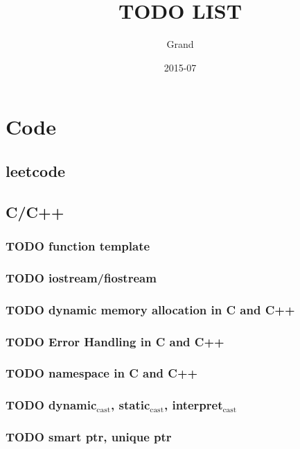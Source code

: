\documentclass[11pt]{article}
\title{\textbf{TODO} LIST}
\author{Grand}
\date{2015-07}
\begin{document}
\maketitle

\setcounter{tocdepth}{3}
\tableofcontents
\vspace*{1cm}


\section{Code}
\label{sec-1}
\subsection{leetcode}
\label{sec-1-1}
\subsection{C/C++}
\label{sec-1-2}
\subsubsection{\textbf{TODO} function template}
\label{sec-1-2-1}
\subsubsection{\textbf{TODO} iostream/fiostream}
\label{sec-1-2-2}
\subsubsection{\textbf{TODO} dynamic memory allocation in C and C++}
\label{sec-1-2-3}
\subsubsection{\textbf{TODO} Error Handling in C and C++}
\label{sec-1-2-4}
\subsubsection{\textbf{TODO} namespace in C and C++}
\label{sec-1-2-5}
\subsubsection{\textbf{TODO} dynamic$_{\mathrm{cast}}$, static$_{\mathrm{cast}}$, interpret$_{\mathrm{cast}}$}
\label{sec-1-2-6}
\subsubsection{\textbf{TODO} smart ptr, unique ptr}
\label{sec-1-2-7}
\end{document}
